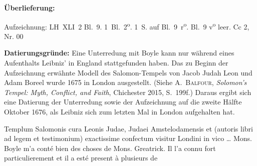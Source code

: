 \begin{ledgroupsized}[r]{120mm}%
\footnotesize%
\pstart%
\noindent\textbf{\"{U}berlieferung:}%
\pend%
\end{ledgroupsized}%
\begin{ledgroupsized}[r]{114mm}%
\footnotesize%
\pstart%
\parindent -6mm%
%
Aufzeichnung:
LH~XLI~2 Bl.~9.
1~Bl.~2\textsuperscript{o}. 1~S. auf Bl.~9~r\textsuperscript{o}.
Bl.~9 v\textsuperscript{o} leer.%
\newline%
Cc 2, Nr. 00%
\pend%
\end{ledgroupsized}%
%
\vspace*{5mm}%
\begin{ledgroup}%
\footnotesize%
\pstart%
\noindent%
\footnotesize{%
\textbf{Datierungsgr\"{u}nde:}
Eine Unterredung mit Boyle kann nur w\"{a}hrend eines Aufenthalts Leibniz' in Eng\-land stattgefunden haben.
Das zu Beginn der Aufzeichnung erw\"{a}hnte Modell des Salomon-Tempels von Jacob Judah Leon und Adam Boreel wurde 1675 in London ausgestellt.
(Siehe \cite{01150}\textsc{A.~Balfour}, \textit{Solomon's Tempel: Myth, Conflict, and Faith}, Chichester 2015, S.~199f.)
Daraus ergibt sich eine Datierung der Unterredung sowie der Aufzeichnung auf die zweite Hälfte Oktober 1676,
als Leibniz sich zum letzten Mal in London aufgehalten hat.}%
\pend%
\end{ledgroup}%
%
%
\vspace*{8mm}%
\count{}
\count{}
\count{}
\pstart%
\normalsize%
\noindent%
[9~r\textsuperscript{o}]
Templum Salomonis\protect{} cura Leonis Judae,\protect{} Judaei Amstelodamensis et
%
\protect{}\protect{}
(autoris libri ad legem et testimonium)
exactissime confectum visitur Londini in vico\protect{} \dots
\pend%
\pstart%
Mons. Boyle\protect{} m'a cont\'{e} bien des choses de Mons. Greatrick.\protect{}
Il l'a connu fort particulierement et il a est\'{e} present \`{a} plusieurs de
